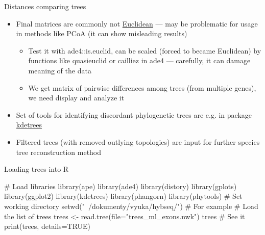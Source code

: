 \documentclass[compress,  xelatex, 11pt, xcolor=x11names, aspectratio=169,
	hyperref={
		bookmarks=true,
		unicode=true,
		colorlinks=true,
		pdftitle={HybSeq course},
		plainpages=false,
		pdfauthor={Vojtech Zeisek},
		pdfsubject={Practical processing of HybSeq target enrichment sequencing data on computing grids like MetaCentrum},
		pdfcreator={XeLaTeX},
		pdfkeywords={BASH, command line, GNU, HybSeq, Linux, MetaCentrum, sequencing shell, target enrichment},
		linkcolor=Turquoise4, %
		anchorcolor=DodgerBlue4, %
		citecolor=DodgerBlue4, %
		filecolor=DodgerBlue4, %
		menucolor=Tan4, %
		urlcolor=DarkOliveGreen4 %
		},
	url={hyphens, lowtilde} %
	]{beamer}
\renewcommand{\texttt}[1]{\colorbox{Cornsilk2}{{\ttfamily #1}}}
\begin{document}
\begin{frame}[allowframebreaks]{Distances comparing trees}
\begin{itemize}
\begin{itemize}
			\item Final matrices are commonly not \href{https://en.wikipedia.org/wiki/Euclidean_distance_matrix}{Euclidean} --- may be problematic for usage in methods like PCoA (it can show misleading results)
			\begin{itemize}
				\item Test it with \texttt{ade4::is.euclid}, can be scaled (forced to became Euclidean) by functions like \texttt{quasieuclid} or \texttt{cailliez} in \texttt{ade4} --- carefully, it can damage meaning of the data
				\item We get matrix of pairwise differences among trees (from multiple genes), we need display and analyze it
			\end{itemize}
			\item Set of tools for identifying discordant phylogenetic trees are e.g. in package \href{https://github.com/V-Z/kdetrees}{kdetrees}
			\item Filtered trees (with removed outlying topologies) are input for further species tree reconstruction method
		\end{itemize}
	\end{itemize}
\end{frame}


\begin{frame}[fragile]{Loading trees into R}
	\begin{spluscode}
    # Load libraries
    library(ape)
    library(ade4)
    library(distory)
    library(gplots)
    library(ggplot2)
    library(kdetrees)
    library(phangorn)
    library(phytools)
    # Set working directory
    setwd("~/dokumenty/vyuka/hybseq/") # For example
    # Load the list of trees
    trees <- read.tree(file="trees_ml_exons.nwk")
    trees # See it
    print(trees, details=TRUE)
	\end{spluscode}
\end{frame}
\end{document}
